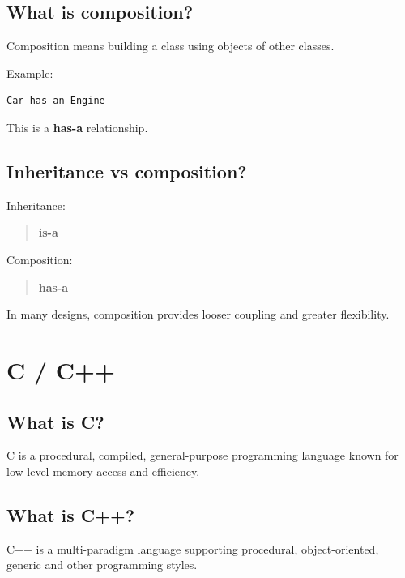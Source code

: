 \medskip

\subsection{What is composition?}

Composition means building a class using objects of other classes.

Example:

\begin{lstlisting}
Car has an Engine
\end{lstlisting}

This is a \textbf{has-a} relationship.

\medskip

\subsection{Inheritance vs composition?}

Inheritance:

\begin{quote}
\textbf{is-a}\\
\end{quote}

Composition:

\begin{quote}
\textbf{has-a}\\
\end{quote}

In many designs, composition provides looser coupling and greater flexibility.

\medskip

\section{C / C++}

\subsection{What is C?}

C is a procedural, compiled, general-purpose programming language known for low-level memory access and efficiency.

\medskip

\subsection{What is C++?}

C++ is a multi-paradigm language supporting procedural, object-oriented, generic and other programming styles.


